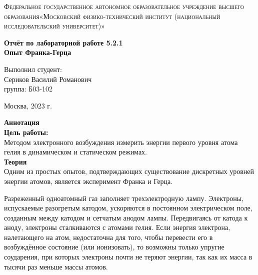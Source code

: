 \documentclass[a4paper, 12pt]{article}%
\begin{document}
	\begin{titlepage}
		\begin{center}
			\textsc{Федеральное государственное автономное образовательное учреждение высшего образования«Московский физико-технический институт (национальный исследовательский университет)»\\[5mm]
			}
			
			\vfill
			
			\textbf{Отчёт по лабораторной работе 5.2.1\\[3mm]
				Опыт Франка-Герца
				\\[50mm]
			}
			
		\end{center}
		
		\hfill
		\begin{minipage}{.5\textwidth}
			Выполнил студент:\\[2mm]
			Сериков Василий Романович\\[2mm]
			группа: Б03-102\\[5mm]
			
		\end{minipage}
		\vfill
		\begin{center}
			Москва, 2023 г.
		\end{center}
		
	\end{titlepage}
	
	\newpage
	\setcounter{page}{2}
	\textbf{Аннотация}\\
	
	\textbf{Цель работы: }\\
Методом электронного возбуждения измерить энергии первого уровня атома гелия в динамическом и статическом режимах.\\

	\textbf{Теория}\\
Одним из простых опытов, подтверждающих существование дискретных уровней энергии атомов, является эксперимент Франка и Герца.

Разреженный одноатомный газ заполняет трехэлектродную лампу.  Электроны, испускаемые разогретым катодом, ускоряются в постоянном электрическом поле, созданным между катодом и сетчатым анодом лампы. Передвигаясь от катода к аноду, электроны сталкиваются с атомами гелия. Если энергия электрона, налетающего на атом, недостаточна для того, чтобы перевести его в возбуждённое состояние (или ионизовать), то возможны только упругие соударения, при которых электроны почти не теряют энергии, так как их масса в тысячи раз меньше массы атомов.
\end{document}

